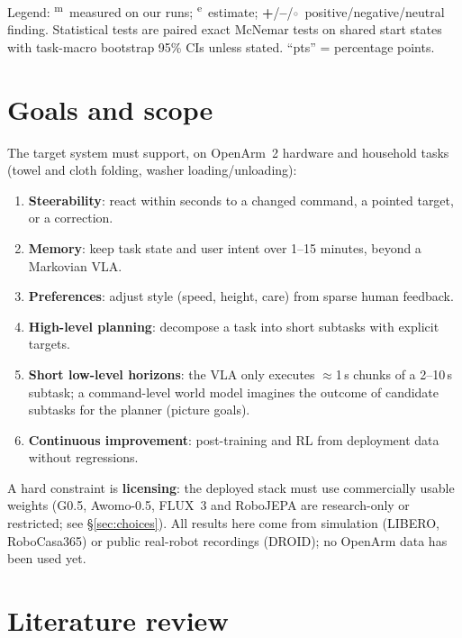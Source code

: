 \documentclass[10pt,a4paper]{article}
\DeclareRobustCommand{\meas}{\textsuperscript{\textcolor{green!50!black}{m}}}
\DeclareRobustCommand{\est}{\textsuperscript{\textcolor{orange!80!black}{e}}}
\newcommand{\pos}{\textcolor{green!45!black}{\textbf{+}}}
\newcommand{\negr}{\textcolor{red!70!black}{\textbf{--}}}
\newcommand{\neu}{\textcolor{gray}{$\circ$}}
\begin{document}
\begin{abstract}
(above). All mission-level numbers need more missions and a real robot.
\end{abstract}

\noindent\small Legend: \meas\ measured on our runs; \est\ estimate; \pos/\negr/\neu\ positive/negative/neutral finding. Statistical tests are paired exact McNemar tests on shared start states with task-macro bootstrap 95\% CIs unless stated. ``pts'' = percentage points.\normalsize

\tableofcontents
\newpage

\section{Goals and scope}
\label{sec:goals}
The target system must support, on OpenArm~2 hardware and household tasks (towel and cloth folding, washer loading/unloading):
\begin{enumerate}
  \item \textbf{Steerability}: react within seconds to a changed command, a pointed target, or a correction.
  \item \textbf{Memory}: keep task state and user intent over 1--15 minutes, beyond a Markovian VLA.
  \item \textbf{Preferences}: adjust style (speed, height, care) from sparse human feedback.
  \item \textbf{High-level planning}: decompose a task into short subtasks with explicit targets.
  \item \textbf{Short low-level horizons}: the VLA only executes $\approx$1\,s chunks of a 2--10\,s subtask; a command-level world model imagines the outcome of candidate subtasks for the planner (picture goals).
  \item \textbf{Continuous improvement}: post-training and RL from deployment data without regressions.
\end{enumerate}
A hard constraint is \textbf{licensing}: the deployed stack must use commercially usable weights (G0.5, Awomo-0.5, FLUX~3 and RoboJEPA are research-only or restricted; see \S\ref{sec:choices}).
All results here come from simulation (LIBERO, RoboCasa365) or public real-robot recordings (DROID); no OpenArm data has been used yet.

\section{Literature review}
\label{sec:lit}
\end{document}
